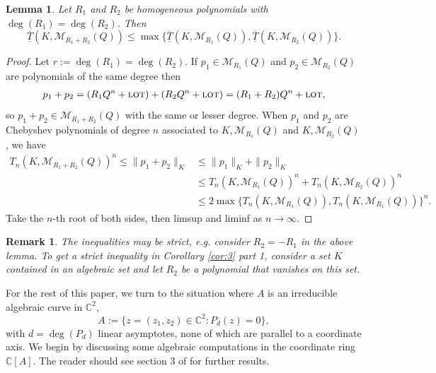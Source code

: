 \documentclass[12pt]{article}
\numberwithin{equation}{section}
\newtheorem{lemma}[theorem]{Lemma}
\newtheorem*{remark*}{Remark}
\newcommand{\C}{\mathbb{C}}
\newcommand{\calM}{\mathcal{M}}
\newcommand{\lot}{\text{\sc lot}}
\newcommand{\bv}{\mathbf{v}}
\begin{document}
\begin{lemma}\label{lem:Tsum}
Let $R_1$ and  $R_2$ be homogeneous polynomials with  $\deg(R_1)=\deg(R_2)$.  Then $$\overline{\underline T}(K,\calM_{R_1+R_2}(Q))\leq  \max\{\overline{\underline T}(K,\calM_{R_1}(Q)), \overline{\underline T}(K,\calM_{R_2}(Q))\}.$$
\end{lemma}
\begin{proof}
Let $r:=\deg(R_1)=\deg(R_2)$.  If $p_1\in\calM_{R_1}(Q)$ and $p_2\in\calM_{R_2}(Q)$ are polynomials of the same degree then
$$\begin{aligned}
p_1+p_2=(R_1Q^{n} +\lot)+ (R_2Q^{n}+\lot) 
= (R_1+R_2)Q^{n} +\lot,  \end{aligned}$$
so $p_1+p_2\in \calM_{R_1+R_2}(Q)$ with the same or lesser degree.  When $p_1$ and $p_2$ are Chebyshev polynomials of degree $n$ associated to $K, \calM_{R_1}(Q)$ and $K, \calM_{R_2}(Q)$, we have
$$\begin{aligned}
T_{n}(K,\calM_{R_1+R_2}(Q))^{n}  \leq \|p_1+p_2\|_K   
&\leq \|p_1\|_K + \|p_2\|_K \\
& \leq T_{n}(K,\calM_{R_1}(Q))^{n} + T_{n}(K,\calM_{R_2}(Q))^{n} \\
& \leq 2\max\{T_{n}(K,\calM_{R_1}(Q)), T_{n}(K,\calM_{R_1}(Q))\}^{n}.
\end{aligned}$$ 
Take the $n$-th root of both sides, then limsup and liminf as $n\to\infty$. 
\end{proof}

\begin{remark*}\rm
The inequalities may be strict, e.g. consider $R_2=-R_1$ in the above lemma.  To get a strict inequality in Corollary \ref{cor:3} part 1, consider a set $K$ contained in an algebraic set and let $R_2$ be a polynomial that vanishes on this set.
\end{remark*}

 
For the rest of this paper, we turn to the situation where $A$ is an irreducible algebraic curve in $\C^2$,  $$A:= \{z=(z_1,z_2)\in \C^2\colon P_d(z)=0\},$$ with $d=\deg(P_d)$ linear asymptotes, none of which are parallel to a coordinate axis. We begin by discussing some algebraic computations in the coordinate ring $ \C[A]$. The reader should see section 3 of \cite{M} for further results. 
\end{document}
